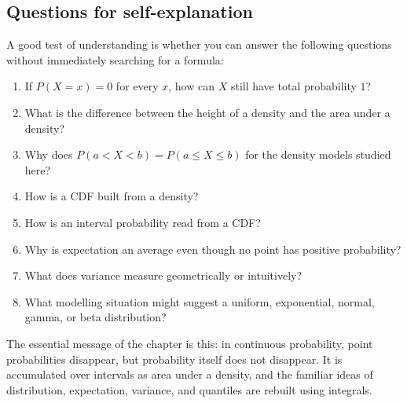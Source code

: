 \subsection*{Questions for self-explanation}

A good test of understanding is whether you can answer the following questions
without immediately searching for a formula:
\begin{enumerate}
    \item If \(P(X=x)=0\) for every \(x\), how can \(X\) still have total
    probability \(1\)?
    \item What is the difference between the height of a density and the area
    under a density?
    \item Why does \(P(a<X<b)=P(a\leq X\leq b)\) for the density models studied
    here?
    \item How is a CDF built from a density?
    \item How is an interval probability read from a CDF?
    \item Why is expectation an average even though no point has positive
    probability?
    \item What does variance measure geometrically or intuitively?
    \item What modelling situation might suggest a uniform, exponential, normal,
    gamma, or beta distribution?
\end{enumerate}

\begin{summarybox}
The essential message of the chapter is this: in continuous probability, point
probabilities disappear, but probability itself does not disappear. It is
accumulated over intervals as area under a density, and the familiar ideas of
distribution, expectation, variance, and quantiles are rebuilt using integrals.
\end{summarybox}
